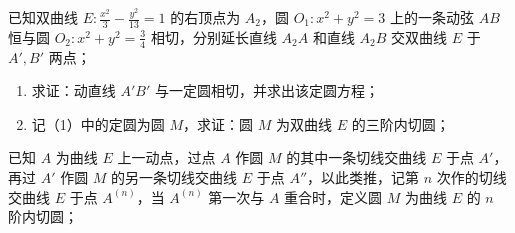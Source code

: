 \begin{exercise}
已知双曲线 \(E: \frac{x^2}{3} - \frac{y^2}{13} = 1\) 的右顶点为 \(A_2\)，圆 \(O_1: x^2 + y^2 = 3\) 上的一条动弦 \(AB\) 恒与圆 \(O_2: x^2 + y^2 = \frac{3}{4}\) 相切，分别延长直线 \(A_2A\) 和直线 \(A_2B\) 交双曲线 \(E\) 于 \(A',B'\) 两点；
\begin{enumerate}
\item 求证：动直线 \(A'B'\) 与一定圆相切，并求出该定圆方程；
\item 记（1）中的定圆为圆 \(M\)，求证：圆 \(M\) 为双曲线 \(E\) 的三阶内切圆；
\end{enumerate}
已知 \(A\) 为曲线 \(E\) 上一动点，过点 \(A\) 作圆 \(M\) 的其中一条切线交曲线 \(E\) 于点 \(A'\)，再过 \(A'\) 作圆 \(M\) 的另一条切线交曲线 \(E\) 于点 \(A''\)，以此类推，记第 \(n\) 次作的切线交曲线 \(E\) 于点 \(A^{(n)}\)，当 \(A^{(n)}\) 第一次与 \(A\) 重合时，定义圆 \(M\) 为曲线 \(E\) 的 \(n\) 阶内切圆；
\end{exercise}
